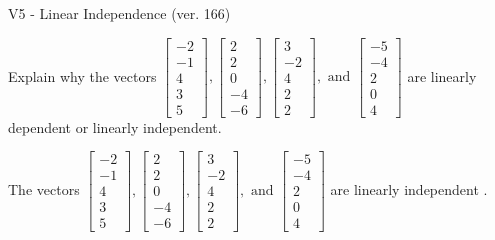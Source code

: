 \begin{exercise}
  \begin{exerciseTitle}V5 - Linear Independence (ver. 166)\end{exerciseTitle}
  \begin{exerciseStatement}
    Explain why the vectors \(\left[\begin{array}{r}
-2 \\
-1 \\
4 \\
3 \\
5
\end{array}\right] , \left[\begin{array}{r}
2 \\
2 \\
0 \\
-4 \\
-6
\end{array}\right] , \left[\begin{array}{r}
3 \\
-2 \\
4 \\
2 \\
2
\end{array}\right] , \text{ and } \left[\begin{array}{r}
-5 \\
-4 \\
2 \\
0 \\
4
\end{array}\right]\) are linearly dependent or linearly independent.	


  \end{exerciseStatement}
  \begin{exerciseAnswer}
   The vectors \(\left[\begin{array}{r}
-2 \\
-1 \\
4 \\
3 \\
5
\end{array}\right] , \left[\begin{array}{r}
2 \\
2 \\
0 \\
-4 \\
-6
\end{array}\right] , \left[\begin{array}{r}
3 \\
-2 \\
4 \\
2 \\
2
\end{array}\right] , \text{ and } \left[\begin{array}{r}
-5 \\
-4 \\
2 \\
0 \\
4
\end{array}\right]\) are 
  	 linearly independent  .
  


  \end{exerciseAnswer}
\end{exercise}